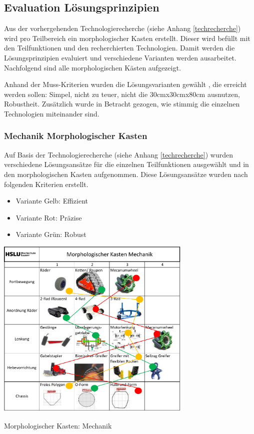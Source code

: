 \subsection{Evaluation Lösungsprinzipien}\label{mk}

Aus der vorhergehenden Technologierecherche (siehe Anhang \ref{techrecherche}) wird pro Teilbereich ein morphologischer Kasten erstellt. Dieser wird befüllt mit den Teilfunktionen und den recherchierten Technologien. Damit werden die Lösungsprinzipien evaluiert und verschiedene Varianten werden ausarbeitet. Nachfolgend sind alle morphologischen Kästen aufgezeigt.

Anhand der Muss-Kriterien wurden die Lösungsvarianten gewählt , die erreicht werden sollen: Simpel, nicht zu teuer, nicht die 30cmx30cmx80cm ausnutzen, Robustheit. Zusätzlich wurde in Betracht gezogen, wie stimmig die einzelnen Technologien miteinander sind.

\subsubsection{Mechanik Morphologischer Kasten}

Auf Basis der Technologierecherche (siehe Anhang \ref{techrecherche}) wurden verschiedene Lösungsansätze für die einzelnen Teilfunktionen ausgewählt und in den morphologischen Kasten aufgenommen.  Diese Lösungsansätze wurden nach folgenden Kriterien erstellt.

\begin{itemize}
    \item Variante Gelb: Effizient
    \item Variante Rot: Präzise
    \item Variante Grün: Robust
\end{itemize}

\begin{table}[H]
\centering
\includegraphics[width=0.7\textwidth]{assets/MK_Maschinentechnik.pdf}
\caption{Morphologischer Kasten: Mechanik}
\label{table:mk-mechanik}
\end{table}


